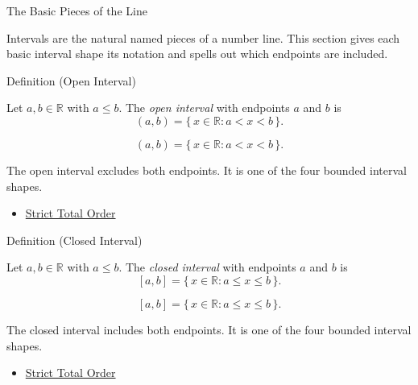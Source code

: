 \begin{topicbox}{The Basic Pieces of the Line}
\begin{exposition}
Intervals are the natural named pieces of a number line. This section gives
each basic interval shape its notation and spells out which endpoints are
included.
\end{exposition}
\end{topicbox}
\begin{definitionbox}{Definition (Open Interval)}
\begin{definition}
\label{def:open-interval}
Let $a,b\in\mathbb{R}$ with $a\le b$. The \emph{open interval} with endpoints $a$ and $b$ is
\[
(a,b)=\{\,x\in\mathbb{R} : a<x<b\,\}.
\]
\end{definition}
\end{definitionbox}
\begin{remark*}
\[
(a,b)=\{\,x\in\mathbb{R} : a<x<b\,\}.
\]
\end{remark*}
\begin{remark*}[Interpretation]
The open interval excludes both endpoints. It is one of the four bounded interval shapes.
\end{remark*}
\begin{dependencies}
\begin{itemize}
  \item \hyperref[def:strict-total-order]{Strict Total Order}
\end{itemize}
\end{dependencies}
\begin{definitionbox}{Definition (Closed Interval)}
\begin{definition}
\label{def:closed-interval}
Let $a,b\in\mathbb{R}$ with $a\le b$. The \emph{closed interval} with endpoints $a$ and $b$ is
\[
[a,b]=\{\,x\in\mathbb{R} : a\le x\le b\,\}.
\]
\end{definition}
\end{definitionbox}
\begin{remark*}
\[
[a,b]=\{\,x\in\mathbb{R} : a\le x\le b\,\}.
\]
\end{remark*}
\begin{remark*}[Interpretation]
The closed interval includes both endpoints. It is one of the four bounded interval shapes.
\end{remark*}
\begin{dependencies}
\begin{itemize}
  \item \hyperref[def:strict-total-order]{Strict Total Order}
\end{itemize}
\end{dependencies}
